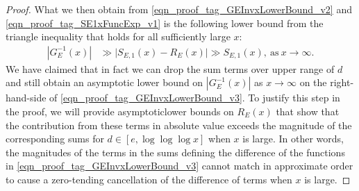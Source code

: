 \documentclass[11pt,reqno,a4letter]{article}
\numberwithin{figure}{section}
\numberwithin{table}{section}
\theoremstyle{plain}
\numberwithin{theorem}{section}
\theoremstyle{definition}
\begin{document}
\begin{proof}
What we then obtain from 
\eqref{eqn_proof_tag_GEInvxLowerBound_v2} and \eqref{eqn_proof_tag_SE1xFuncExp_v1} 
is the following lower bound from the triangle inequality 
that holds for all sufficiently large $x$: 
\begin{align} 
\label{eqn_proof_tag_GEInvxLowerBound_v3}
|G_E^{-1}(x)| & \gg 
     \Biggl\lvert S_{E,1}(x) - R_E(x) \Biggr\rvert \gg S_{E,1}(x), \mathrm{\ as\ } 
     x \rightarrow \infty. 
\end{align} 
We have claimed that in fact we can drop the sum terms over upper range of $d$ and still 
obtain an asymptotic lower bound on $|G_E^{-1}(x)|$ as $x \rightarrow \infty$ on the 
right-hand-side of \eqref{eqn_proof_tag_GEInvxLowerBound_v3}. 
To justify this step in the proof, 
we will provide asymptoticlower bounds on $R_E(x)$ that show that the 
contribution from these terms in absolute value exceeds the magnitude of the 
corresponding sums for $d \in [e, \log\log\log x]$ when $x$ is large. 
In other words, the magnitudes of the terms in the sums 
defining the difference of the functions in \eqref{eqn_proof_tag_GEInvxLowerBound_v3} 
cannot match in approximate order to cause a zero-tending 
cancellation of the difference of terms when $x$ is large. 


\end{proof}
\end{document}
